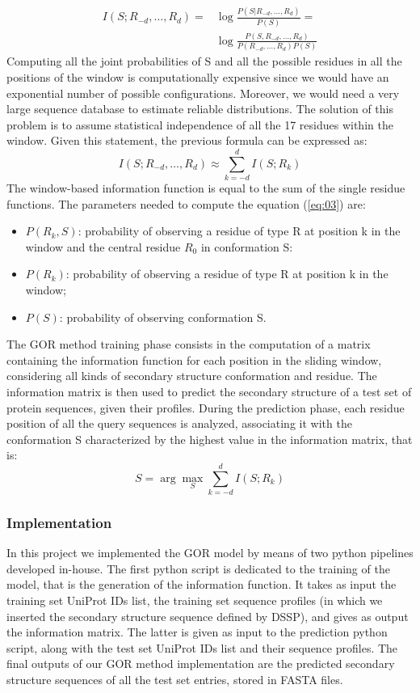 \documentclass[nocrop]{bioinfo}
\begin{document}
\begin{methods}
\begin{equation}
\begin{split}
    I(S; R_{-d},\dots,R_{d}) =& \log \frac{P(S|R_{-d},\dots,R_d)}{P(S)} =\\
    &\log \frac{P(S,R_{-d},\dots,R_d)}{P(R_{-d},\dots,R_d)P(S)}
\end{split}
\end{equation}
Computing all the joint probabilities of S and all the possible residues in all the positions of the window is computationally expensive since we would have an exponential number of possible configurations. Moreover, we would need a very large sequence database to estimate reliable distributions. The solution of this problem is to assume statistical independence of all the 17 residues within the window. Given this statement, the previous formula can be expressed as:
\begin{equation} \label{eq:03}
    I(S; R_{-d},\dots,R_{d})\approx \sum_{k=-d}^{d}I(S; R_{k})
\end{equation}
The window-based information function is equal to the sum of the single residue functions. The parameters needed to compute the equation (\ref{eq:03}) are:
\begin{itemize}
    \item $P(R_k,S)$: probability of observing a residue of type R at position k in the window and the central residue $R_0$ in conformation S:
    \item $P(R_k)$: probability of observing a residue of type R at position k in the window;
    \item $P(S)$: probability of observing conformation S.
\end{itemize}
The GOR method training phase consists in the computation of a matrix containing the information function for each position in the sliding window, considering all kinds of secondary structure conformation and residue. The information matrix is then used to predict the secondary structure of a test set of protein sequences, given their profiles. During the prediction phase, each residue position of all the query sequences is analyzed, associating it with the conformation S characterized by the highest value in the information matrix, that is:
\begin{equation}
    S = \arg\max_{S}\sum_{k=-d}^{d}I(S; R_{k})
\end{equation}
\subsubsection{Implementation}
In this project we implemented the GOR model by means of two python pipelines developed in-house. The first python script is dedicated to the training of the model, that is the generation of the information function. It takes as input the training set UniProt IDs list, the training set sequence profiles (in which we inserted the secondary structure sequence defined by DSSP), and gives as output the information matrix. The latter is given as input to the prediction python script, along with the test set UniProt IDs list and their sequence profiles. The final outputs of our GOR method implementation are the predicted secondary structure sequences of all the test set entries, stored in FASTA files. 


\end{methods}
\end{document}
